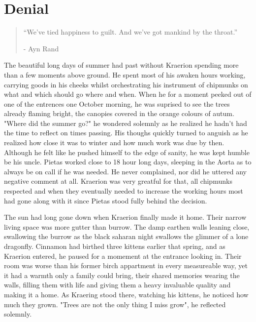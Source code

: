 \documentclass[smalldemyvopaper,11pt,twoside,onecolumn,openright,extrafontsizes]{memoir}
\begin{document}
\chapter{Denial}

\vspace{-1.3cm}
\begin{localsize}{10}
  \begin{quote}
    “We've tied happiness to guilt. And we've got mankind by the throat.”
    \begin{flushright}- Ayn Rand \end{flushright}
  \end{quote} 
\end{localsize}
\vspace{1cm}



The beautiful long days of summer had past without Kraerion spending more than a few moments above ground. He spent most of his awaken hours working, carrying goods in his cheeks whilst orchestrating his instrument of chipmunks on what and which should go where and when. When he for a moment peeked out of one of the entrences one October morning, he was suprised to see the trees already flaming bright, the canopies covered in the orange colours of autum. "Where did the summer go?" he wondered solemnly as he realized he hadn't had the time to reflect on times passing. His thoughs quickly turned to anguish as he realized how close it was to winter and how much work was due by then. Although he felt like he pushed himself to the edge of sanity, he was kept humble be his uncle. Pietas worked close to 18 hour long days, sleeping in the Aorta as to always be on call if he was needed. He never complained, nor did he uttered any negative comment at all. Kraerion was very greatful for that, all chipmunks respected and when they eventually needed to increase the working hours most had gone along with it since Pietas stood fully behind the decision.

The sun had long gone down when Kraerion finally made it home. Their narrow living space was more gutter than burrow. The damp earthen walls leaning close, swallowing the burrow as the black saharan night swallows the glimmer of a lone dragonfly. Cinnamon had birthed three kittens earlier that spring, and as Kraerion entered, he paused for a momement at the entrance looking in. Their room was worse than his former birch appartment in every measureable way, yet it had a warmth only a family could bring, their shared memories wearing the walls, filling them with life and giving them a heavy invaluable quality and making it a home. As Kraering stood there, watching his kittens, he noticed how much they grown. "Trees are not the only thing I miss grow", he reflected solemnly.
\end{document}
